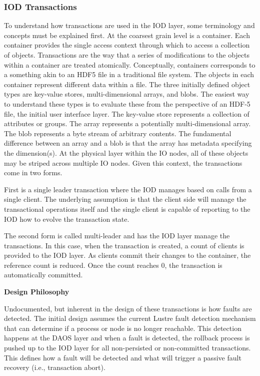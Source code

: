 \documentclass[conference]{IEEEtran}
\begin{document}
\subsubsection{IOD Transactions}
To understand how transactions are used in the IOD layer, some terminology and
concepts must be explained first. At the coarsest grain level is a container.
Each container provides the single access context through which to access a
collection of objects. Transactions are the way that a series of modifications
to the objects within a container are treated atomically. Conceptually,
containers corresponds to a something akin to an HDF5 file in a traditional
file system. The objects in each container represent different data within a
file.  The three initially defined object types are key-value stores,
multi-dimensional arrays, and blobs.  The easiest way to understand these types
is to evaluate these from the perspective of an HDF-5 file, the initial user
interface layer. The key-value store represents a collection of attributes or
groups. The array represents a potentially multi-dimensional array.  The blob
represents a byte stream of arbitrary contents.  The fundamental difference
between an array and a blob is that the array has metadata specifying the
dimension(s). At the physical layer within the IO nodes, all of these objects
may be striped across multiple IO nodes.  Given this context, the transactions
come in two forms.

First is a single leader transaction where the IOD manages based on calls from
a single client. The underlying assumption is that the client side will manage
the transactional operations itself and the single client is capable of
reporting to the IOD how to evolve the transaction state. 

The second form is called multi-leader and has the IOD layer manage the
transactions. In this case, when the transaction is created, a count of clients
is provided to the IOD layer. As clients commit their changes to the container,
the reference count is reduced. Once the count reaches 0, the transaction is
automatically committed.

\noindent\textbf{Design Philosophy}

Undocumented, but inherent in the design of these transactions is how faults
are detected. The initial design assumes the current Lustre fault detection
mechanism that can determine if a process or node is no longer reachable. This
detection happens at the DAOS layer and when a fault is detected, the rollback
process is pushed up to the IOD layer for all non-persisted or non-committed
transactions. This defines how a fault will be detected and what will trigger a
passive fault recovery (i.e., transaction abort).
\end{document}
